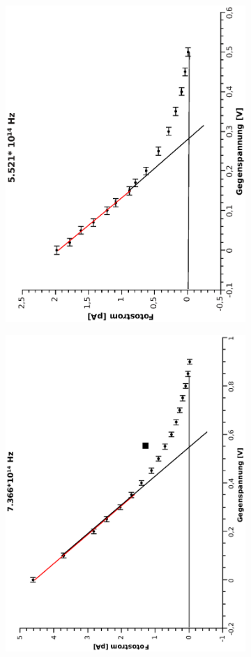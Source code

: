 \documentclass[12pt]{article}
\begin{document}
\begin{figure}
\begin{subfigure}{0.48\linewidth}
\includegraphics[width=0.75\linewidth, angle=-90]{5521.eps}
\end{subfigure}
\begin{subfigure}{0.48\textwidth}
\includegraphics[width=0.75\linewidth, angle=-90]{7366.eps}

\end{subfigure}
\end{figure}
\end{document}
